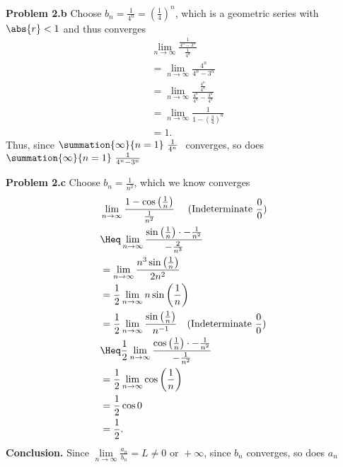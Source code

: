 \documentclass{report}
\begin{document}
    \pagebreak \bigbreak \noindent 
    \textbf{Problem 2.b} Choose $b_{n} = \frac{1}{4^{n}} = \left(\frac{1}{4}\right)^{n}$, which is a geometric series with $\abs{r}  < 1$ and thus converges
    \begin{align*}
        &\lim\limits_{n \to \infty}{\frac{\frac{1}{4^{n} -3^{n}}}{\frac{1}{4^{n}}}}  \\
        &=\lim\limits_{n \to \infty}{\frac{4^{n}}{4^{n} -3^{n}}} \\
        &=\lim\limits_{n \to \infty}{\frac{\frac{4^{n}}{4^{n}}}{\frac{4^{n}}{4^{n}}-\frac{3^{n}}{4^{n}}}} \\
        &=\lim\limits_{n \to \infty}{\frac{1}{1-\left(\frac{3}{4}\right)^{n}}} \\
        &=1
    .\end{align*}
    \bigbreak \noindent 
    Thus, since $\summation{\infty}{n=1}\ \frac{1}{4^{n}}\  $ converges, so does $\summation{\infty}{n=1}\ \frac{1}{4^{n} -3^{n}}\  $

    \bigbreak \noindent 
    \textbf{Problem 2.c} Choose $b_{n}  =\frac{1}{n^{2}}$, which we know converges
    \begin{align*}
        &\lim\limits_{n \to \infty}{\frac{1-\cos{\left(\frac{1}{n}\right)}}{\frac{1}{n^{2}}}}\ \quad \text{(Indeterminate $\frac{0}{0}$)} \\
        &\Heq\lim\limits_{n \to \infty}{\frac{\sin{\left(\frac{1}{n}\right)}\cdot -\frac{1}{n^{2}}}{-\frac{2}{n^{3}}}} \\
        &=\lim\limits_{n \to \infty}{\frac{n^{3}\sin{\left(\frac{1}{n}\right)}}{2n^{2}}} \\
        &=\frac{1}{2}\lim\limits_{n \to \infty}{n\sin{\left(\frac{1}{n}\right)}} \\
        &=\frac{1}{2}\lim\limits_{n \to \infty}{\frac{\sin{\left(\frac{1}{n}\right)}}{n^{-1}}} \quad \text{(Indeterminate $\frac{0}{0}$)} \\
        &\Heq \frac{1}{2}\lim\limits_{n \to \infty}{\frac{\cos{\left(\frac{1}{n}\right)}\cdot -\frac{1}{n^{2}}}{-\frac{1}{n^{2}}}} \\
        &=\frac{1}{2}\lim\limits_{n \to \infty}{\cos{\left(\frac{1}{n}\right)}} \\
        &=\frac{1}{2}\cos{0} \\
        &=\frac{1}{2}
    .\end{align*}
    \bigbreak \noindent 
    \textbf{Conclusion.}  Since $\lim\limits_{n \to \infty}{\frac{a_{n}}{b_{n}}} = L \ne 0 \text{ or } +\infty$, since $b_{n}$ converges, so does $a_{n}$ 
\end{document}

